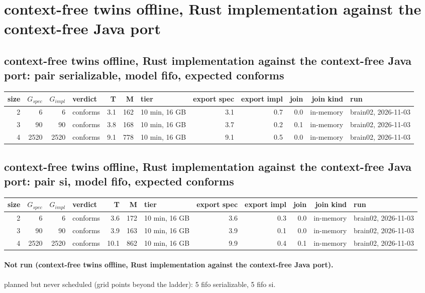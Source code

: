 \documentclass[10pt]{article}
\begin{document}
\section*{context-free twins offline, Rust implementation against the context-free Java port}
\subsection*{context-free twins offline, Rust implementation against the context-free Java port: pair \textsf{serializable}, model fifo, expected conforms}
\begin{longtable}{@{}rrrlrrlrrrrl@{}}
\toprule
size & $G_{\mathit{spec}}$ & $G_{\mathit{impl}}$ & verdict & T & M & tier & export spec & export impl & join & join kind & run \\
\midrule
\endhead
\color{red} 2 & 6 & 6 & conforms & 3.1 & 162 & 10 min, 16 GB & 3.1 & 0.7 & 0.0 & in-memory & brain02, 2026-11-03 \\
\color{red} 3 & 90 & 90 & conforms & 3.8 & 168 & 10 min, 16 GB & 3.7 & 0.2 & 0.1 & in-memory & brain02, 2026-11-03 \\
\color{red} 4 & 2520 & 2520 & conforms & 9.1 & 778 & 10 min, 16 GB & 9.1 & 0.5 & 0.0 & in-memory & brain02, 2026-11-03 \\
\bottomrule
\end{longtable}
\subsection*{context-free twins offline, Rust implementation against the context-free Java port: pair \textsf{si}, model fifo, expected conforms}
\begin{longtable}{@{}rrrlrrlrrrrl@{}}
\toprule
size & $G_{\mathit{spec}}$ & $G_{\mathit{impl}}$ & verdict & T & M & tier & export spec & export impl & join & join kind & run \\
\midrule
\endhead
\color{red} 2 & 6 & 6 & conforms & 3.6 & 172 & 10 min, 16 GB & 3.6 & 0.3 & 0.0 & in-memory & brain02, 2026-11-03 \\
\color{red} 3 & 90 & 90 & conforms & 3.9 & 163 & 10 min, 16 GB & 3.9 & 0.1 & 0.0 & in-memory & brain02, 2026-11-03 \\
\color{red} 4 & 2520 & 2520 & conforms & 10.1 & 862 & 10 min, 16 GB & 9.9 & 0.4 & 0.1 & in-memory & brain02, 2026-11-03 \\
\bottomrule
\end{longtable}
\paragraph{Not run (context-free twins offline, Rust implementation against the context-free Java port).}
planned but never scheduled (grid points beyond the ladder): 5 fifo serializable, 5 fifo si.\par
\end{document}
